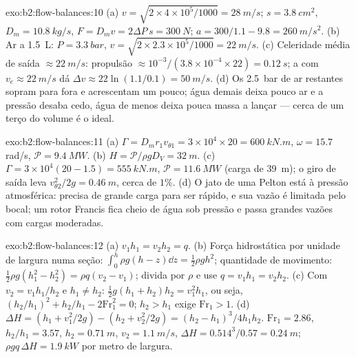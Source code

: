 \begin{solution}{exo:b2:flow-balances:10}
(a) $v = \sqrt{2 \times 4 \times 10^5/1000} = \qty{28}{m/s}$; $s = \qty{3.8}{cm^2}$, $D_m =
\qty{10.8}{kg/s}$, $F = D_mv = 2\Delta P\,s = \qty{300}{N}$; $a = 300/1.1 - 9.8 =
\qty{260}{m/s^2}$. (b) Ar a \qty{1.5}{L}: $P = \qty{3.3}{bar}$, $v = \sqrt{2 \times 2.3 \times
10^5/1000} = \qty{22}{m/s}$. (c) Celeridade média de saída $\approx \qty{22}{m/s}$: propulsão $\approx 10^{-3}
/(3.8 \times 10^{-4} \times 22) = \qty{0.12}{s}$; a  com $v_e \approx \qty{22}{m/s}$ dá
$\Delta v \approx 22\ln(1.1/0.1) = \qty{50}{m/s}$. (d) Os \qty{2.5}{bar} de ar restantes
sopram para fora e acrescentam um pouco; água demais deixa pouco ar e a
pressão desaba cedo, água de menos deixa pouca massa a lançar ---
cerca de um terço do volume é o ideal.
\end{solution}

\begin{solution}{exo:b2:flow-balances:11}
(a) $\Gamma = D_mr_1v_{\theta1} = 3 \times 10^4 \times 20 = \qty{600}{kN.m}$, $\omega = 15.7$ rad/s,
$\mathcal P = \qty{9.4}{MW}$. (b) $H = \mathcal P/\rho gD_V = \qty{32}{m}$. (c) $\Gamma = 3 \times
10^4(20 - 1.5) = \qty{555}{kN.m}$, $\mathcal P = \qty{11.6}{MW}$ (carga de \qty{39}{m}); o
giro de saída leva $v_{\theta2}^2/2g = \qty{0.46}{m}$, cerca de $1\%$. (d) O jato de uma Pelton
está à pressão atmosférica: precisa de grande carga para ser rápido, e sua
vazão é limitada pelo bocal; um rotor Francis fica cheio de água sob
pressão e passa grandes vazões com cargas moderadas.
\end{solution}

\begin{solution}{exo:b2:flow-balances:12}
(a) $v_1h_1 = v_2h_2 = q$. (b) Força hidrostática por unidade de largura numa
seção: $\int_0^h\rho g(h - z)\dd z = \tfrac12\rho gh^2$; quantidade de movimento: $\tfrac12\rho g(h_1^2
- h_2^2) = \rho q(v_2 - v_1)$; divida por $\rho$ e use $q = v_1h_1 = v_2h_2$.
(c) Com $v_2 = v_1h_1/h_2$ e $h_1 \ne h_2$: $\tfrac12g(h_1 + h_2)h_2 = v_1^2h_1$,
ou seja, $(h_2/h_1)^2 + h_2/h_1 - 2\mathrm{Fr}_1^2 = 0$; $h_2 > h_1$ exige $\mathrm{Fr}_1 > 1$.
(d) $\Delta H = (h_1 + v_1^2/2g) - (h_2 + v_2^2/2g) = (h_2 - h_1)^3/4h_1h_2$.
$\mathrm{Fr}_1 = 2.86$, $h_2/h_1 = 3.57$, $h_2 = \qty{0.71}{m}$, $v_2 = \qty{1.1}{m/s}$,
$\Delta H = 0.514^3/0.57 = \qty{0.24}{m}$; $\rho gq\,\Delta H = \qty{1.9}{kW}$ por metro de
largura.
\end{solution}

